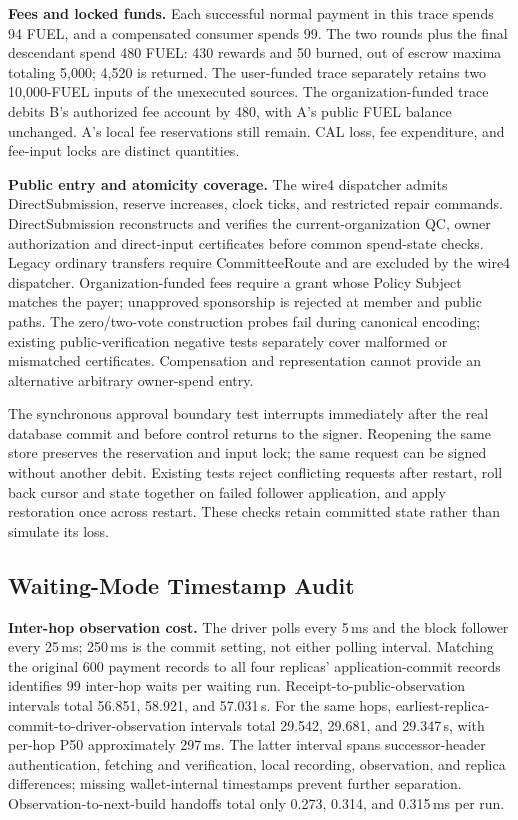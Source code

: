 \noindent\textbf{Fees and locked funds.}
Each successful normal payment in this trace spends 94 FUEL, and a
compensated consumer spends 99. The two rounds plus the final descendant
spend 480 FUEL: 430 rewards and 50 burned, out of escrow maxima totaling
5,000; 4,520 is returned. The user-funded trace separately retains two
10,000-FUEL inputs of the unexecuted sources. The organization-funded
trace debits B's authorized fee account by 480, with A's public FUEL
balance unchanged. A's local fee reservations still remain. CAL loss,
fee expenditure, and fee-input locks are distinct quantities.

\noindent\textbf{Public entry and atomicity coverage.}
The wire4 dispatcher admits DirectSubmission, reserve increases, clock
ticks, and restricted repair commands. DirectSubmission reconstructs and
verifies the current-organization QC, owner authorization and direct-input
certificates before common spend-state checks. Legacy ordinary transfers
require CommitteeRoute and are excluded by the wire4 dispatcher.
Organization-funded fees require a grant whose Policy Subject matches
the payer; unapproved sponsorship is rejected at member and public paths.
The zero/two-vote construction probes fail during canonical encoding;
existing public-verification negative tests separately cover malformed or
mismatched certificates. Compensation and representation cannot provide
an alternative arbitrary owner-spend entry.

The synchronous approval boundary test interrupts immediately after the
real database commit and before control returns to the signer. Reopening
the same store preserves the reservation and input lock; the same request
can be signed without another debit. Existing tests reject conflicting
requests after restart, roll back cursor and state together on failed
follower application, and apply restoration once across restart. These
checks retain committed state rather than simulate its loss.

\subsection{Waiting-Mode Timestamp Audit}
\noindent\textbf{Inter-hop observation cost.}
The driver polls every 5\,ms and the block follower every 25\,ms;
250\,ms is the commit setting, not either polling interval.
Matching the original 600 payment records to all four replicas'
application-commit records identifies 99 inter-hop waits per waiting
run. Receipt-to-public-observation intervals total
56.851, 58.921, and 57.031\,s.
For the same hops, earliest-replica-commit-to-driver-observation
intervals total 29.542, 29.681, and 29.347\,s, with per-hop
P50 approximately 297\,ms. The latter interval spans successor-header
authentication, fetching and verification, local recording, observation,
and replica differences; missing wallet-internal timestamps prevent
further separation. Observation-to-next-build handoffs total only
0.273, 0.314, and 0.315\,ms per run.

